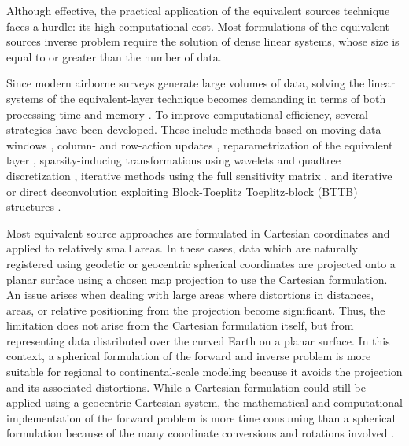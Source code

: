 \documentclass[a4paper,oneside,10pt]{book}
\begin{document}
Although effective, the practical application of the equivalent sources
technique faces a hurdle: its high computational cost.
Most formulations of the equivalent sources inverse problem require the
solution of dense linear systems, whose size is equal to or greater than the
number of data.

Since modern airborne surveys generate large volumes of data,
solving the linear systems of the equivalent-layer technique becomes
demanding in terms of both processing time and memory
\citep{OliveiraJunior2023}. To improve computational efficiency,
several strategies have been developed. These include methods
based on moving data windows \citep{Leao1989,Soler2021,Uppal2025},
column- and row-action updates \citep{Cordell1992,Mendonca1994,Guspi2009},
re\-para\-me\-trization of the equivalent layer \citep{OliveiraJr2013,Mendonca2020},
sparsity-inducing transformations using wavelets and quadtree discretization
\citep{Li2010,Barnes2011}, iterative methods using the full sensitivity matrix
\citep{Xia1991,Xia1993,Siqueira2017,Jirigalatu2019}, and iterative or direct
deconvolution exploiting Block-Toeplitz Toeplitz-block (BTTB) structures
\citep{Takahashi2020,Takahashi2022}.

Most equivalent source approaches are formulated in Cartesian
coordinates and applied to relatively small areas.
In these cases, data which are naturally registered using geodetic or geocentric
spherical coordinates are projected onto a planar surface using a chosen map
projection to use the Cartesian formulation.
An issue arises when dealing with large areas where distortions in distances,
areas, or relative positioning from the projection become significant.
Thus, the limitation does not arise from the Cartesian formulation
itself, but from representing data distributed over the curved
Earth on a planar surface. In this context, a spherical
formulation of the forward and inverse problem is more suitable for
regional to continental-scale modeling because it avoids the projection and its
associated distortions.
While a Cartesian formulation could still be applied using a geocentric
Cartesian system, the mathematical and computational implementation of the
forward problem is more time consuming than a spherical formulation because of
the many coordinate conversions and rotations involved \citep{WildPfeiffer2008}.
\end{document}
